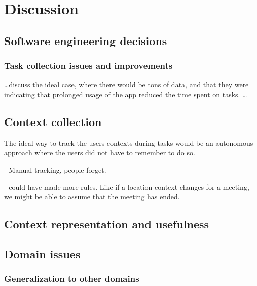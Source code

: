 \chapter{Discussion}
\label{chap:discussion}

\section{Software engineering decisions}

\subsection{Task collection issues and improvements}
\ldots discuss the ideal case, where there would be tons of data, and that they were indicating that prolonged usage of the app reduced the time spent on tasks. \ldots


\section{Context collection}

The ideal way to track the users contexts during tasks would be an autonomous approach where the users did not have to remember to do so.

- Manual tracking, people forget.

- could have made more rules. Like if a location context changes for a meeting, we might be able to assume that the meeting has ended.

\section{Context representation and usefulness}



\section{Domain issues}


\subsection{Generalization to other domains}